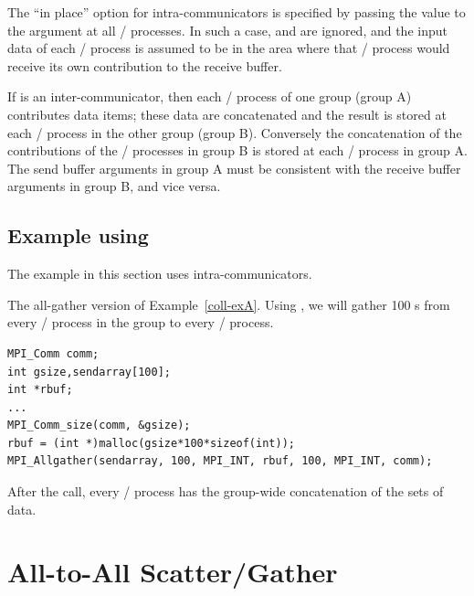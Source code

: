 The ``in place'' option  for intra-communicators is specified by passing the
value
 to the argument  at all \MPI/ processes.
In such a case,  and  are ignored, and the input data
of each \MPI/ process is assumed to be in the area where that
\MPI/ process would receive its own contribution to the receive
buffer.

If  is an inter-communicator, then each \MPI/ process
of one group (group A) contributes 
data items; these data are concatenated and the result
is stored at each \MPI/ process in the other
group (group B).  Conversely the concatenation of the
contributions of the \MPI/ processes in group B is stored at each \MPI/ process in
group A.   The send buffer arguments in group A must be consistent
with the receive buffer arguments in group B, and vice versa.

\subsection{Example using \texorpdfstring{}{MPI\_ALLGATHER}}
\label{coll:allgather-ex}

The example in this section uses intra-communicators.

\begin{example}
\label{coll-exY}
%
The all-gather version of Example~\ref{coll-exA}.
Using , we will gather 100 s from every \MPI/ process in the
group to every \MPI/ process.

\begin{lstlisting}[language={[MPI]C}]
MPI_Comm comm;
int gsize,sendarray[100];
int *rbuf;
...
MPI_Comm_size(comm, &gsize);
rbuf = (int *)malloc(gsize*100*sizeof(int));
MPI_Allgather(sendarray, 100, MPI_INT, rbuf, 100, MPI_INT, comm);
\end{lstlisting}

After the call, every \MPI/ process has the group-wide concatenation of the
sets of data.
\end{example}

\section{All-to-All Scatter/Gather}
\label{sec:coll-alltoall}

